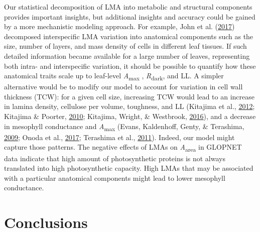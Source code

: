 \documentclass[12pt,]{article}
\theoremstyle{definition}
\theoremstyle{definition}
\theoremstyle{definition}
\theoremstyle{remark}
\begin{document}
Our statistical decomposition of LMA into metabolic and structural
components provides important insights, but additional insights and
accuracy could be gained by a more mechanistic modeling approach. For
example, John et al. (\protect\hyperlink{ref-John2017}{2017}) decomposed
interspecific LMA variation into anatomical components such as the size,
number of layers, and mass density of cells in different leaf tissues.
If such detailed information became available for a large number of
leaves, representing both intra- and interspecific variation, it should
be possible to quantify how these anatomical traits scale up to
leaf-level \emph{A}\textsubscript{max} , \emph{R}\textsubscript{dark},
and LL. A simpler alternative would be to modify our model to account
for variation in cell wall thickness (TCW): for a given cell size,
increasing TCW would lead to an increase in lamina density, cellulose
per volume, toughness, and LL (Kitajima et al.,
\protect\hyperlink{ref-Kitajima2012}{2012}; Kitajima \& Poorter,
\protect\hyperlink{ref-Kitajima2010}{2010}; Kitajima, Wright, \&
Westbrook, \protect\hyperlink{ref-Kitajima2016}{2016}), and a decrease
in mesophyll conductance and \emph{A}\textsubscript{max} (Evans,
Kaldenhoff, Genty, \& Terashima,
\protect\hyperlink{ref-Evans2009}{2009}; Onoda et al.,
\protect\hyperlink{ref-Onoda2017}{2017}; Terashima et al.,
\protect\hyperlink{ref-Terashima2011}{2011}). Indeed, our model might
capture those patterns. The negative effects of LMAs on
\emph{A}\textsubscript{area} in GLOPNET data indicate that high amount
of photosynthetic proteins is not always translated into high
photosynthetic capacity. High LMAs that may be associated with a
particular anatomical components might lead to lower mesophyll
conductance.

\hypertarget{conclusions}{%
\section{Conclusions}\label{conclusions}}
\end{document}

